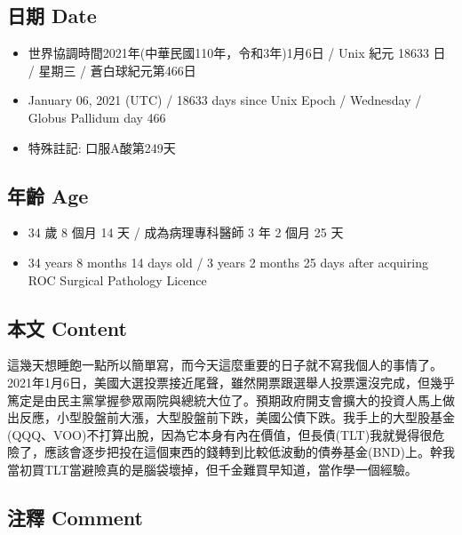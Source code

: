 \documentclass[a5paper, 10pt
]{book}
\providecommand{\tightlist}{%
  \setlength{\itemsep}{0pt}\setlength{\parskip}{0pt}}
\begin{document}
\hypertarget{ux65e5ux671f-date-36}{%
\subsection{日期 Date}\label{ux65e5ux671f-date-36}}

\begin{itemize}
\tightlist
\item
  世界協調時間2021年(中華民國110年，令和3年)1月6日 / Unix 紀元 18633 日
  / 星期三 / 蒼白球紀元第466日
\item
  January 06, 2021 (UTC) / 18633 days since Unix Epoch / Wednesday /
  Globus Pallidum day 466
\item
  特殊註記: 口服A酸第249天
\end{itemize}

\hypertarget{ux5e74ux9f61-age-36}{%
\subsection{年齡 Age}\label{ux5e74ux9f61-age-36}}

\begin{itemize}
\tightlist
\item
  34 歲 8 個月 14 天 / 成為病理專科醫師 3 年 2 個月 25 天
\item
  34 years 8 months 14 days old / 3 years 2 months 25 days after
  acquiring ROC Surgical Pathology Licence
\end{itemize}

\hypertarget{ux672cux6587-content-36}{%
\subsection{本文 Content}\label{ux672cux6587-content-36}}

這幾天想睡飽一點所以簡單寫，而今天這麼重要的日子就不寫我個人的事情了。2021年1月6日，美國大選投票接近尾聲，雖然開票跟選舉人投票還沒完成，但幾乎篤定是由民主黨掌握參眾兩院與總統大位了。預期政府開支會擴大的投資人馬上做出反應，小型股盤前大漲，大型股盤前下跌，美國公債下跌。我手上的大型股基金(QQQ、VOO)不打算出脫，因為它本身有內在價值，但長債(TLT)我就覺得很危險了，應該會逐步把投在這個東西的錢轉到比較低波動的債券基金(BND)上。幹我當初買TLT當避險真的是腦袋壞掉，但千金難買早知道，當作學一個經驗。

\hypertarget{ux6ce8ux91cb-comment-36}{%
\subsection{注釋 Comment}\label{ux6ce8ux91cb-comment-36}}
\end{document}
